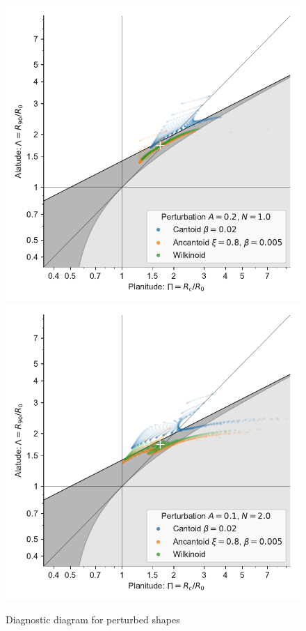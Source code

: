 \begin{figure}
  \centering
  \includegraphics[width=\linewidth]
  {figs/wave-R90-vs-Rc-A020-N10}
  \includegraphics[width=\linewidth]
  {figs/wave-R90-vs-Rc-A010-N20}
  \caption{Diagnostic diagram for perturbed shapes}
  \label{fig:perturb-Rc-R90}
\end{figure}



